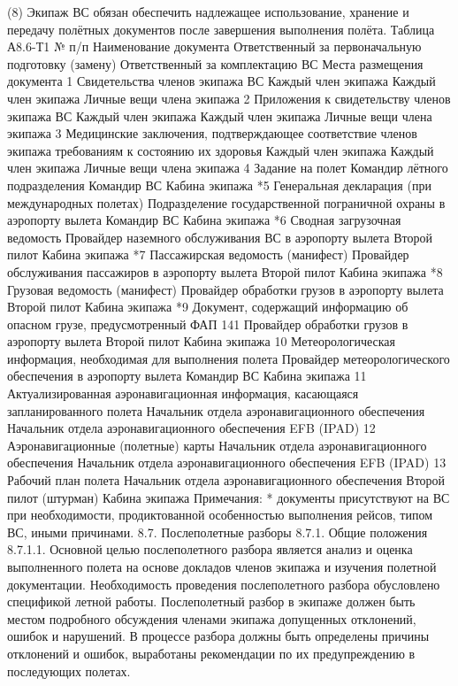 (8)	Экипаж ВС обязан обеспечить надлежащее использование, хранение и передачу полётных документов после завершения выполнения полёта. 
                                                                                                                                                 Таблица А8.6-Т1
№
п/п	Наименование документа	Ответственный за первоначальную подготовку (замену)	Ответственный за комплектацию ВС	Места размещения документа
1	Свидетельства членов экипажа ВС	Каждый член экипажа	Каждый член экипажа	Личные вещи члена экипажа
2	Приложения к свидетельству членов экипажа ВС	Каждый член экипажа	Каждый член экипажа	Личные вещи члена экипажа
3	Медицинские заключения, подтверждающее соответствие членов экипажа требованиям к состоянию их здоровья	Каждый член экипажа	Каждый член экипажа	Личные вещи члена экипажа
4	Задание на полет	Командир лётного подразделения	Командир ВС	Кабина экипажа
*5	Генеральная декларация (при международных полетах)	Подразделение государственной пограничной охраны в аэропорту вылета	Командир ВС	Кабина экипажа
*6	Сводная загрузочная ведомость	Провайдер наземного обслуживания ВС в аэропорту вылета	Второй пилот	Кабина экипажа
*7	Пассажирская ведомость (манифест)	Провайдер обслуживания пассажиров в аэропорту вылета	Второй пилот	Кабина экипажа
*8	Грузовая ведомость (манифест)	Провайдер обработки грузов в аэропорту вылета	Второй пилот	Кабина экипажа
*9	Документ, содержащий информацию об опасном грузе, предусмотренный ФАП 141	Провайдер обработки грузов в аэропорту вылета	Второй пилот	Кабина экипажа
10	Метеорологическая информация, необходимая для выполнения полета	Провайдер метеорологического обеспечения в аэропорту вылета	Командир ВС	Кабина экипажа
11	Актуализированная аэронавигационная информация, касающаяся запланированного полета	Начальник отдела аэронавигационного обеспечения	Начальник отдела аэронавигационного обеспечения	EFB (IPAD)
12	Аэронавигационные (полетные) карты	Начальник отдела аэронавигационного обеспечения	Начальник отдела аэронавигационного обеспечения	EFB (IPAD)
13	Рабочий план полета	Начальник отдела аэронавигационного обеспечения	Второй пилот (штурман)	Кабина экипажа
Примечания:
*	документы присутствуют на ВС при необходимости, продиктованной особенностью выполнения рейсов, типом ВС, иными причинами.
8.7. Послеполетные разборы
8.7.1. Общие положения
8.7.1.1. Основной целью послеполетного разбора является анализ и оценка выполненного полета на основе докладов членов экипажа и изучения полетной документации. 
Необходимость проведения послеполетного разбора обусловлено спецификой летной работы. 
Послеполетный разбор в экипаже должен быть местом подробного обсуждения членами экипажа допущенных отклонений, ошибок и нарушений. В процессе разбора должны быть определены причины отклонений и ошибок, выработаны рекомендации по их предупреждению в последующих полетах. 
